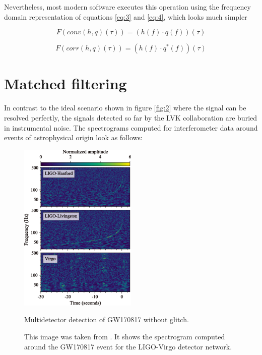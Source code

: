 \FloatBarrier


Nevertheless, most modern software executes this operation using the frequency domain representation of equations \ref{eq:3} and \ref{eq:4}, which looks much simpler

\begin{equation}\label{eq:5}
F \left(conv(h,q)(\tau) \right)= \left( h(f) \cdot q(f) \right)(\tau)
\end{equation}


\begin{equation}\label{eq:6}
F \left( corr(h,q)(\tau) \right)= \left( h(f) \cdot q^*(f) \right) (\tau)
\end{equation}




\newpage

\section{Matched filtering}

In contrast to the ideal scenario shown in figure \ref{fig:2} where the signal can be resolved perfectly, the signals detected so far by the LVK collaboration \cite{LIGOScientific:2021djp} are buried in instrumental noise. The spectrograms computed for interferometer data around events of astrophysical origin look as follows:

\begin{figure}[hbt!]
\begin{center}
\includegraphics[width=0.5\textwidth, angle=0]{images/170817mult.png}
\captionsetup{width=0.8\textwidth}
\caption{Multidetector detection of GW170817 without glitch.}
\caption*{This image was taken from \cite{LIGOScientific:2017vwq}. It shows the spectrogram computed around the GW170817 event for the LIGO-Virgo detector network.}
\label{ofeijf}
\end{center}

\end{figure}

